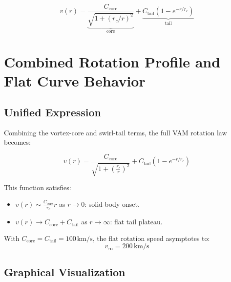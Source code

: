 \documentclass[12pt]{article}
\begin{document}
\[
v(r) = \underbrace{ \frac{C_{\text{core}}}{\sqrt{1 + (r_c/r)^2}} }_{\text{core}} + \underbrace{ C_{\text{tail}} (1 - e^{-r/r_c}) }_{\text{tail}}
\]

\section{Combined Rotation Profile and Flat Curve Behavior}
\label{appendix:combined-vam-profile}

\subsection{Unified Expression}

Combining the vortex-core and swirl-tail terms, the full VAM rotation law becomes:

\begin{equation}
    \boxed{
    v(r) = \frac{C_{\text{core}}}{\sqrt{1 + \left( \frac{r_c}{r} \right)^2}} + C_{\text{tail}} \left(1 - e^{-r/r_c} \right)
    }
    \label{eq:full_vam_profile}
\end{equation}

This function satisfies:
\begin{itemize}
    \item \( v(r) \sim \frac{C_{\text{core}}}{r_c} r \) as \( r \to 0 \): solid-body onset.
    \item \( v(r) \to C_{\text{core}} + C_{\text{tail}} \) as \( r \to \infty \): flat tail plateau.
\end{itemize}

With \( C_{\text{core}} = C_{\text{tail}} = 100\,\text{km/s} \), the flat rotation speed asymptotes to:
\[
v_\infty = 200\,\text{km/s}
\]

\subsection{Graphical Visualization}
\end{document}
